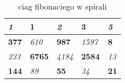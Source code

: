 

\begin{table}[]
\centering
\begin{tabular}{|l|l|l|l|l|}
\hline
\textit{1}   & \textbf{1}    & \textit{2}    & \textbf{3}    & \textit{5}  \\ \hline
\textbf{377} & \textit{610}  & \textbf{987}  & \textit{1597} & \textbf{8}  \\ \hline
\textit{233} & \textbf{6765} & \textit{4184} & \textbf{2584} & \textit{13} \\ \hline
\textbf{144} & \textit{89}   & \textbf{55}   & \textit{34}   & \textbf{21} \\ \hline
\end{tabular}
\label{tab:fib}
\caption{ciag fibonaciego w spirali}
\end{table}